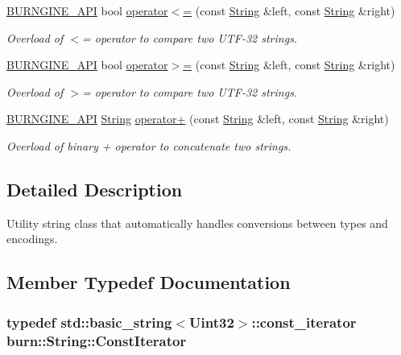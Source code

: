 \begin{DoxyCompactItemize}
\hyperlink{_export_8h_a5040e4252a67428f940a23fa9dbfec7b}{B\-U\-R\-N\-G\-I\-N\-E\-\_\-\-A\-P\-I} bool \hyperlink{classburn_1_1_string_a316ac376afd496075145d92318e04ab8}{operator$<$=} (const \hyperlink{classburn_1_1_string}{String} \&left, const \hyperlink{classburn_1_1_string}{String} \&right)
\begin{DoxyCompactList}\small\item\em Overload of $<$= operator to compare two U\-T\-F-\/32 strings. \end{DoxyCompactList}\item 
\hyperlink{_export_8h_a5040e4252a67428f940a23fa9dbfec7b}{B\-U\-R\-N\-G\-I\-N\-E\-\_\-\-A\-P\-I} bool \hyperlink{classburn_1_1_string_adf45e6d139d925c476c5dcabfa676bba}{operator$>$=} (const \hyperlink{classburn_1_1_string}{String} \&left, const \hyperlink{classburn_1_1_string}{String} \&right)
\begin{DoxyCompactList}\small\item\em Overload of $>$= operator to compare two U\-T\-F-\/32 strings. \end{DoxyCompactList}\item 
\hyperlink{_export_8h_a5040e4252a67428f940a23fa9dbfec7b}{B\-U\-R\-N\-G\-I\-N\-E\-\_\-\-A\-P\-I} \hyperlink{classburn_1_1_string}{String} \hyperlink{classburn_1_1_string_aeea4a77b7b5306c4632804a6e80a9f28}{operator+} (const \hyperlink{classburn_1_1_string}{String} \&left, const \hyperlink{classburn_1_1_string}{String} \&right)
\begin{DoxyCompactList}\small\item\em Overload of binary + operator to concatenate two strings. \end{DoxyCompactList}\end{DoxyCompactItemize}


\subsection{Detailed Description}
Utility string class that automatically handles conversions between types and encodings. 

\subsection{Member Typedef Documentation}
\hypertarget{classburn_1_1_string_a323849432c1bf90a416b1afceb37e1ff}{
\subsubsection[{Const\-Iterator}]{\setlength{\rightskip}{0pt plus 5cm}typedef std\-::basic\-\_\-string$<${\bf Uint32}$>$\-::const\-\_\-iterator {\bf burn\-::\-String\-::\-Const\-Iterator}}}\label{classburn_1_1_string_a323849432c1bf90a416b1afceb37e1ff}



